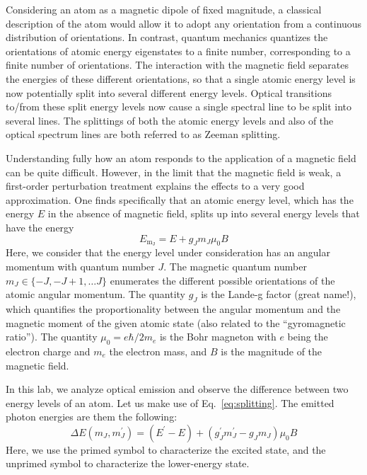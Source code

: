 \documentclass{../lab}
\begin{document}
Considering an atom as a magnetic dipole of fixed magnitude, a classical description of the atom would allow it to adopt any orientation from a continuous distribution of orientations.  In contrast, quantum mechanics quantizes the orientations of atomic energy eigenstates to a finite number, corresponding to a finite number of orientations.  The interaction with the magnetic field separates the energies of these different orientations, so that a single atomic energy level is now potentially split into several different energy levels.  Optical transitions to/from these split energy levels now cause a single spectral line to be split into several lines.  The splittings of both the atomic energy levels and also of the optical spectrum lines are both referred to as Zeeman splitting.

Understanding fully how an atom responds to the application of a magnetic field can be quite difficult.  However, in the limit that the magnetic field is weak, a first-order perturbation treatment explains the effects to a very good approximation.  One finds specifically that an atomic energy level, which has the energy $E$ in the absence of magnetic field, splits up into several energy levels that have the energy
\begin{equation}
    E_\mathrm{m_J} = E + g_J m_J \mu_0 B
    \label{eq:splitting}
\end{equation}
Here, we consider that the energy level under consideration has an angular momentum with quantum number $J$.  The magnetic quantum number $m_J \in \{-J, -J+1, \ldots J\}$ enumerates the different possible orientations of the atomic angular momentum.  The quantity $g_J$ is the Lande-g factor (great name!), which quantifies the proportionality between the angular momentum and the magnetic moment of the given atomic state (also related to the ``gyromagnetic ratio'').  The quantity $\mu_0 = e \hbar / 2 m_e$ is the Bohr magneton with $e$ being the electron charge and $m_e$ the electron mass, and $B$ is the magnitude of the magnetic field.

In this lab, we analyze optical emission and observe the difference between two energy levels of an atom.  Let us make use of Eq.\ \ref{eq:splitting}.  The emitted photon energies are them the following:
\begin{equation}
    \Delta E(m_J, m_J^\prime) = (E^\prime - E) + \left(g_J^\prime m_J^\prime - g_J m_J \right) \mu_0 B
\end{equation}
Here, we use the primed symbol to characterize the excited state, and the unprimed symbol to characterize the lower-energy state.
\end{document}
